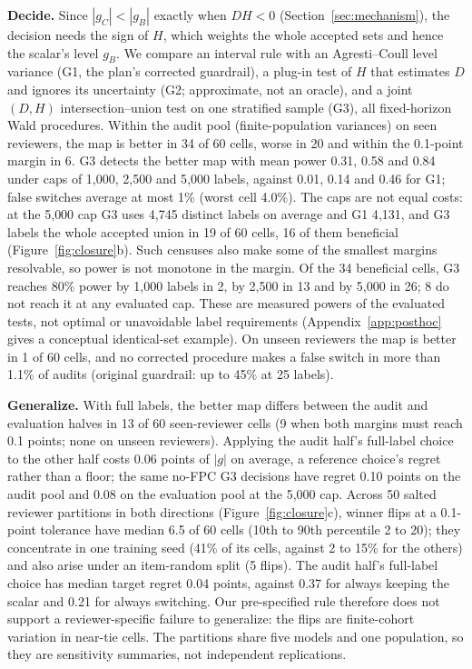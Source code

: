 \documentclass[sigconf,anonymous,review]{acmart}
\begin{document}
\textbf{Decide.} Since $|g_C|<|g_B|$ exactly when $DH<0$
(Section~\ref{sec:mechanism}), the decision needs the sign of $H$,
which weights the whole accepted sets and hence the scalar's level
$g_B$. We compare an interval rule with an Agresti--Coull level variance (G1,
the plan's corrected guardrail), a plug-in test of $H$ that estimates $D$ and ignores its
uncertainty (G2; approximate, not an oracle), and a joint $(D,H)$
intersection--union test on one stratified sample (G3), all fixed-horizon
Wald procedures. Within the audit pool (finite-population variances) on
seen reviewers, the map is better in 34 of 60 cells, worse in 20 and
within the 0.1-point margin in 6. G3 detects the better map with mean power 0.31, 0.58
and 0.84 under caps of 1{,}000, 2{,}500 and 5{,}000 labels, against 0.01,
0.14 and 0.46 for G1; false switches average at most 1\% (worst cell
4.0\%). The caps are not equal costs: at the 5{,}000 cap G3 uses 4{,}745
distinct labels on average and G1 4{,}131, and G3 labels the whole
accepted union in 19 of 60 cells, 16 of them beneficial
(Figure~\ref{fig:closure}b). Such censuses also make some of the
smallest margins resolvable, so power is not monotone in the margin. Of the 34
beneficial cells, G3 reaches 80\% power by 1{,}000 labels in 2, by
2{,}500 in 13 and by 5{,}000 in 26; 8 do not reach it at any evaluated cap. These are measured powers
of the evaluated tests, not optimal or unavoidable label requirements
(Appendix~\ref{app:posthoc} gives a conceptual identical-set example). On
unseen reviewers the map is better in 1 of 60 cells, and no corrected
procedure makes a false switch in more than 1.1\% of audits (original
guardrail: up to 45\% at 25 labels).

\textbf{Generalize.} With full labels, the better map differs between
the audit and evaluation halves in 13 of 60 seen-reviewer cells (9 when
both margins must reach 0.1 points; none on unseen reviewers). Applying the audit half's full-label choice to the other half costs 0.06 points
of $|g|$ on average, a reference choice's regret rather than a floor; the
same no-FPC G3 decisions have regret 0.10 points on the audit pool and
0.08 on the evaluation pool at the 5{,}000 cap. Across 50 salted reviewer partitions
in both directions (Figure~\ref{fig:closure}c), winner flips at a
0.1-point tolerance have median 6.5 of 60 cells (10th to 90th percentile
2 to 20); they concentrate in one training seed (41\% of its cells,
against 2 to 15\% for the others) and also arise under an item-random
split (5 flips). The audit half's full-label choice has median target
regret 0.04 points, against 0.37 for always keeping the scalar and 0.21
for always switching. Our pre-specified rule therefore does not support
a reviewer-specific failure to generalize: the flips are finite-cohort
variation in near-tie cells. The partitions share five models and one population, so they are
sensitivity summaries, not independent replications.
\end{document}
